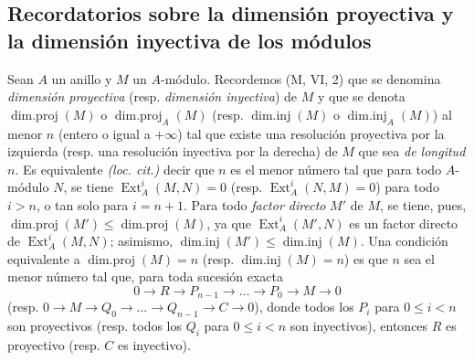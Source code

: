 \subsection{Recordatorios sobre la dimensión proyectiva y la dimensión inyectiva de los
módulos}
\label{subsection:0.17.2-fr}

\begin{env}[17.2.1]
\label{0.17.2.1-fr}
Sean $A$ un anillo y $M$ un $A$-módulo. Recordemos (M, VI, 2) que se denomina
\emph{dimensión proyectiva} (resp. \emph{dimensión inyectiva}) de $M$ y que
se denota $\operatorname{dim.proj}(M)$ o
$\operatorname{dim.proj}_A(M)$ (resp. $\operatorname{dim.inj}(M)$ o
$\operatorname{dim.inj}_A(M)$) al menor $n$ (entero o igual a $+\infty$)
tal que existe una resolución proyectiva por la izquierda (resp. una resolución
inyectiva por la derecha) de $M$ que sea \emph{de longitud $n$}. Es equivalente
\emph{(loc. cit.)} decir que $n$ es el menor número tal que para todo
$A$-módulo $N$, se tiene $\operatorname{Ext}^i_A(M,N)=0$ (resp.
$\operatorname{Ext}^i_A(N,M)=0$) para todo $i>n$, o tan solo para $i=n+1$.
Para todo \emph{factor directo} $M'$ de $M$, se tiene, pues,
$\operatorname{dim.proj}(M')\leq\operatorname{dim.proj}(M)$, ya que
$\operatorname{Ext}^i_A(M',N)$ es un factor directo de
$\operatorname{Ext}^i_A(M,N)$; asimismo,
$\operatorname{dim.inj}(M')\leq\operatorname{dim.inj}(M)$. Una condición
equivalente a $\operatorname{dim.proj}(M)=n$ (resp.
$\operatorname{dim.inj}(M)=n$) es que $n$ sea el menor número tal que,
para toda sucesión exacta
\[
  0\longrightarrow R\longrightarrow P_{n-1}\longrightarrow\ldots
  \longrightarrow P_0\longrightarrow M\longrightarrow0
\]
(resp.
$0\longrightarrow M\longrightarrow Q_0\longrightarrow\ldots
\longrightarrow Q_{n-1}\longrightarrow C\longrightarrow0$), donde todos los
$P_i$ para $0\leq i<n$ son proyectivos (resp. todos los $Q_i$ para $0\leq i<n$
son inyectivos), entonces $R$ es proyectivo (resp. $C$ es inyectivo).
\end{env}


